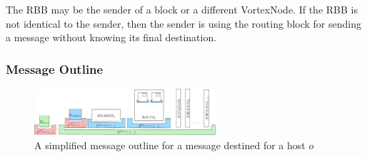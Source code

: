 \documentclass[10pt,journal,compsoc,twocolumn,twoside]{IEEEtran}
\let\MYoriglatexcaption\caption
\renewcommand{\caption}[2][\relax]{\MYoriglatexcaption[#2]{#2}}
\begin{document}
The RBB may be the sender of a block or a different VortexNode. If the RBB is not identical to the sender, then the sender is using the routing block for sending a message without knowing its final destination.

\subsubsection{Message Outline\label{sec:messageOutline}}
\begin{figure}[ht]
	\centering\includegraphics[width=0.6\textwidth]{blockLayoutSimplified}
	\caption{A simplified message outline for a message destined for a host $o$}
	\label{fig:messageOutline}
\end{figure}

\end{document}
